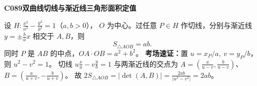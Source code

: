 \textbf{C089\quad 双曲线切线与渐近线三角形面积定值}

设 $H:\frac{x^2}{a^2}-\frac{y^2}{b^2}=1$（$a,b>0$），
$O$ 为中心。过任意 $P\in H$ 作切线，分别与渐近线
$y=\pm\frac ba x$ 相交于 $A,B$，则
\[
\boxed{S_{\triangle AOB}=ab}. 
\]
同时 $P$ 是 $AB$ 的中点，$OA\cdot OB=a^2+b^2$。
\textbf{考场速证：}置 $u=x_P/a,\ v=y_P/b$，则 $u^2-v^2=1$。
切线 $u\frac xa-v\frac yb=1$ 与两渐近线的交点为
$A=(\frac{a}{u-v},\frac{b}{u-v})$、
$B=(\frac{a}{u+v},-\frac{b}{u+v})$。
故 $2S_{\triangle AOB}=|\det(A,B)|=
\frac{2ab}{|u^2-v^2|}=2ab$。
